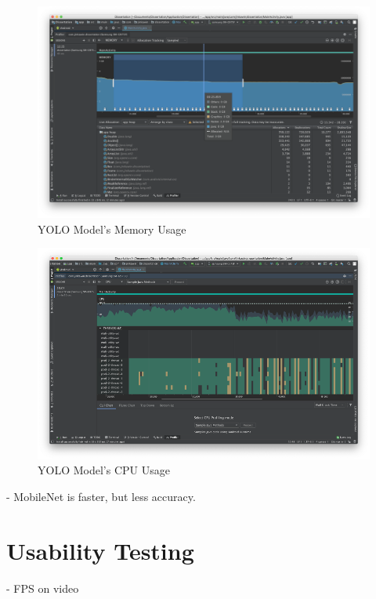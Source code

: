         \begin{figure}[!ht]
            \includegraphics[width=6in]{images/chapter5/gc-problem/gc-collecting.png}
            \caption{YOLO Model's Memory Usage}
            \label{yolo:memoryUsage}
        \end{figure}

        \begin{figure}[!ht]
            \includegraphics[width=6in]{images/chapter5/YOLO/cpu-usage-8threads.png}
            \caption{YOLO Model's CPU Usage}
            \label{yolo:cpuUsage}
        \end{figure}

        - MobileNet is faster, but less accuracy.

    \section{Usability Testing}
        - FPS on video